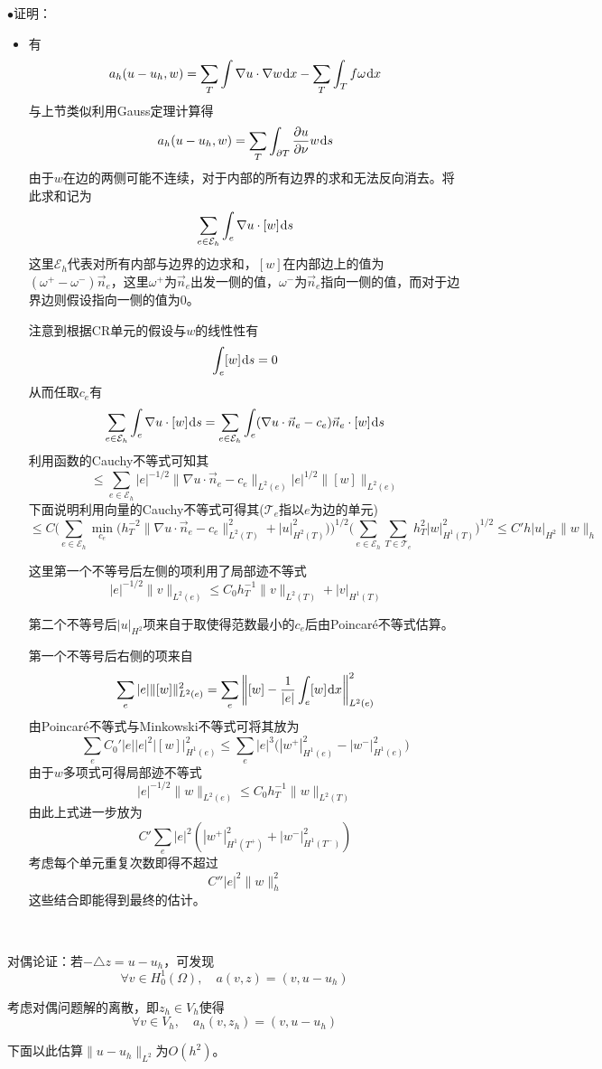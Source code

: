 \documentclass[a4paper,UTF8,fontset=windows]{ctexart}
\newcommand*{\dr}{\hspace{0.07em}\mathrm{d}}
\newcommand*{\ce}{\mathcal{E}}
\newcommand*{\ct}{\mathcal{T}}
\newcommand{\proo}[1]{{\kaishu $\bullet$证明：
\begin{itemize}
    \item[] #1
\end{itemize}
}}
\begin{document}
\proo{
    有
    $$a_h(u-u_h,w)=\sum_T\int\nabla u\cdot\nabla w\dr x-\sum_T\int_T f\omega\dr x$$
    与上节类似利用Gauss定理计算得
    $$a_h(u-u_h,w)=\sum_T\int_{\partial T}\frac{\partial u}{\partial\nu}w\dr s$$
    由于$w$在边的两侧可能不连续，对于内部的所有边界的求和无法反向消去。将此求和记为
    $$\sum_{e\in\ce_h}\int_e\nabla u\cdot[w]\dr s$$
    这里$\ce_h$代表对所有内部与边界的边求和，$[w]$在内部边上的值为$(\omega^+-\omega^-)\vec{n}_e$，这里$\omega^+$为$\vec{n}_e$出发一侧的值，$\omega^-$为$\vec{n}_e$指向一侧的值，而对于边界边则假设指向一侧的值为0。

    注意到根据CR单元的假设与$w$的线性性有
    $$\int_e[w]\dr s=0$$
    从而任取$c_e$有
    $$\sum_{e\in\ce_h}\int_e\nabla u\cdot[w]\dr s=\sum_{e\in\ce_h}\int_e(\nabla u\cdot\vec{n}_e-c_e)\vec{n}_e\cdot [w]\dr s$$
    利用函数的Cauchy不等式可知其
    $$\le\sum_{e\in\ce_h}|e|^{-1/2}\|\nabla u\cdot\vec{n}_e-c_e\|_{L^2(e)}|e|^{1/2}\|[w]\|_{L^2(e)}$$
    下面说明利用向量的Cauchy不等式可得其($\ct_e$指以$e$为边的单元)
    $$\le C\bigg(\sum_{e\in\ce_h}\min_{c_e}\bigg(h_T^{-2}\|\nabla u\cdot\vec{n}_e-c_e\|_{L^2(T)}^2+|u|_{H^2(T)}^2\bigg)\bigg)^{1/2}\bigg(\sum_{e\in\ce_h}\sum_{T\in\ct_e}h_T^2|w|_{H^1(T)}^2\bigg)^{1/2}\le C'h|u|_{H^2}\|w\|_h$$

    这里第一个不等号后左侧的项利用了局部迹不等式
    $$|e|^{-1/2}\|v\|_{L^2(e)}\le C_0h_T^{-1}\|v\|_{L^2(T)}+|v|_{H^1(T)}$$

    第二个不等号后$|u|_{H^2}$项来自于取使得范数最小的$c_e$后由Poincar\'e不等式估算。

    第一个不等号后右侧的项来自
    $$\sum_e|e|\|[w]\|_{L^2(e)}^2=\sum_e\bigg\|[w]-\frac{1}{|e|}\int_e[w]\dr x\bigg\|_{L^2(e)}^2$$
    由Poincar\'e不等式与Minkowski不等式可将其放为
    $$\sum_eC_0'|e||e|^2|[w]|_{H^1(e)}^2\le\sum_e|e|^3\big(|w^+|_{H^1(e)}^2-|w^-|_{H^1(e)}^2\big)$$
    由于$w$多项式可得局部迹不等式
    $$|e|^{-1/2}\|w\|_{L^2(e)}\le C_0h_T^{-1}\|w\|_{L^2(T)}$$
    由此上式进一步放为
    $$C'\sum_e|e|^2(|w^+|_{H^1(T^+)}^2+|w^-|_{H^1(T^-)}^2)$$
    考虑每个单元重复次数即得不超过
    $$C''|e|^2\|w\|_h^2$$
    这些结合即能得到最终的估计。
}

\

对偶论证：若$-\triangle z=u-u_h$，可发现
$$\forall v\in H_0^1(\Omega),\quad a(v,z)=(v,u-u_h)$$

考虑对偶问题解的离散，即$z_h\in V_h$使得
$$\forall v\in V_h,\quad a_h(v,z_h)=(v,u-u_h)$$

下面以此估算$\|u-u_h\|_{L^2}$为$O(h^2)$。
\end{document}
